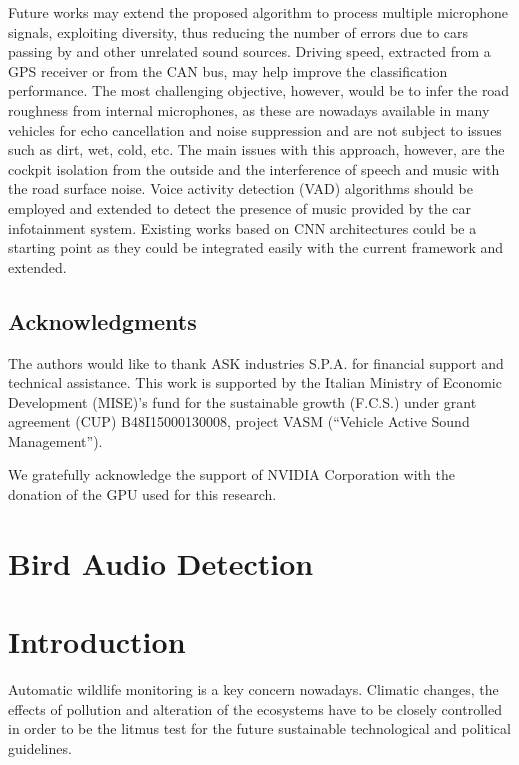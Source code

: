 Future works may extend the proposed algorithm to process multiple microphone signals, exploiting diversity, thus reducing the number of errors due to cars passing by and other unrelated sound sources. Driving speed, extracted from a GPS receiver or from the CAN bus, may help improve the classification performance. The most challenging objective, however, would be to infer the road roughness from internal microphones, as these are nowadays available in many vehicles for echo cancellation and noise suppression and are not subject to issues such as dirt, wet, cold, etc. The main issues with this approach, however, are the cockpit isolation from the outside and the interference of speech and music with the road surface noise. Voice activity detection (VAD) \cite{Ephraim:1984,ghosh2011robust} algorithms should be employed and extended to detect the presence of music provided by the car infotainment system. Existing works based on CNN architectures \cite{wirn2016-vad,ijcnn2016-vad} could be a starting point as they could be integrated easily with the current framework and extended.


\subsection*{Acknowledgments}
The authors would like to thank ASK industries S.P.A. for financial support and technical assistance.
This work is supported by the Italian Ministry of Economic Development (MISE)'s fund for the sustainable growth (F.C.S.) under grant agreement (CUP) B48I15000130008, project VASM (“Vehicle Active Sound Management”).

We gratefully acknowledge the support of NVIDIA Corporation with the donation of the GPU used for this research.


\section{Bird Audio Detection}
\section{Introduction}
\label{sec:intro}

Automatic wildlife monitoring is a key concern nowadays. Climatic changes, the effects of pollution and alteration of the ecosystems have to be closely controlled in order to be the litmus test for the future sustainable technological and political guidelines.

